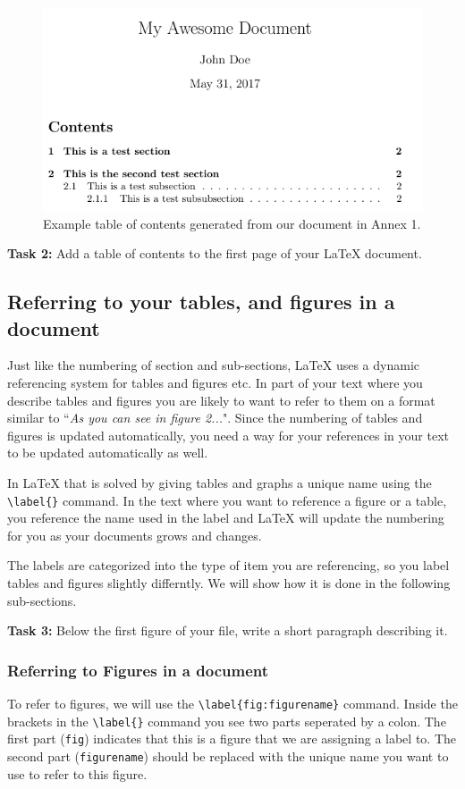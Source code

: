 \documentclass[12pts]{article}
\begin{document}
	\begin{figure}[H]
		\centering
		\includegraphics[width=.8\linewidth]{../img/tableofcontents2}
		\caption{Example table of contents generated from our document in Annex 1.}
		\label{fig:tableofcontents}
	\end{figure}

	\textcolor{BurntOrange}{\textbf{Task 2:}} Add a table of contents to the first page of your {\LaTeX} document.
		
	\subsection{Referring to your tables, and figures in a document}
	
	Just like the numbering of section and sub-sections, {\LaTeX} uses a dynamic referencing system for tables and figures etc. In part of your text where you describe tables and figures you are likely to want to refer to them on a format similar to ``\textit{As you can see in figure 2...}". Since the numbering of tables and figures is updated automatically, you need a way for your references in your text to be updated automatically as well.
	
	In {\LaTeX} that is solved by giving tables and graphs a unique name using the \verb|\label{}| command. In the text where you want to reference a figure or a table, you reference the name used in the label and {\LaTeX} will update the numbering for you as your documents grows and changes.
	
	The labels are categorized into the type of item you are referencing, so you label tables and figures slightly differntly. We will show how it is done in the following sub-sections.
	
	\textcolor{BurntOrange}{\textbf{Task 3:}} Below the first figure of your file, write a short paragraph describing it.
	
	\subsubsection{Referring to Figures in a document}
	To refer to figures, we will use the \verb|\label{fig:figurename}| command. Inside the brackets in the \verb|\label{}| command you see two parts seperated by a colon. The first part (\texttt{fig}) indicates that this is a figure that we are assigning a label to. The second part (\texttt{figurename}) should be replaced with the unique name you want to use to refer to this figure.
	
\end{document}
